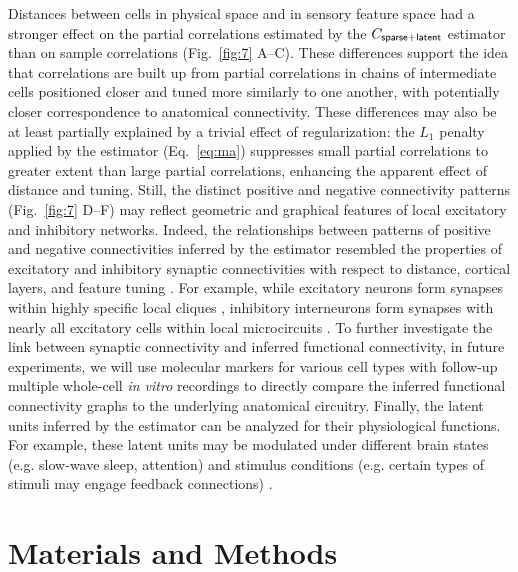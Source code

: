 Distances between cells in physical space and in sensory feature space had a stronger effect on the partial correlations estimated by the $C_{\sf sparse+latent}$ estimator than on sample correlations (Fig.~\ref{fig:7} A--C).
These differences support the idea that correlations are built up from partial correlations in chains of intermediate cells positioned closer and tuned more similarly to one another, with potentially closer correspondence to anatomical connectivity.  These differences may also be at least partially explained by a trivial effect of regularization: the $L_1$ penalty applied by the estimator (Eq.~\ref{eq:ma}) suppresses small partial correlations to greater extent than large partial correlations, enhancing the apparent effect of distance and tuning.  
Still, the distinct positive and negative connectivity patterns (Fig.\ \ref{fig:7} D--F)  may reflect geometric and graphical features of local excitatory and inhibitory networks. 
Indeed, the relationships between patterns of positive and negative connectivities inferred by the estimator resembled the properties of excitatory and inhibitory synaptic connectivities with respect to distance, cortical layers, and feature tuning \cite{Song:2005, Oswald:2008, Adesnik:2010, Perin:2011, Fino:2011, Hofer:2011, Isaacson:2011, Levy:2012}. For example, while excitatory neurons form synapses within highly specific local cliques \cite{Perin:2011}, inhibitory interneurons form synapses with nearly all excitatory cells within local microcircuits \cite{Fino:2011, Hofer:2011, Packer:2011}.  To further investigate the link between synaptic connectivity and inferred functional connectivity, in future experiments, we will use molecular markers for various cell types with follow-up multiple whole-cell \emph{in vitro} recordings \cite{Hofer:2011, Ko:2013} to directly compare the inferred functional connectivity graphs to the underlying anatomical circuitry. Finally, the latent units inferred by the estimator can be analyzed for their physiological functions. For example, these latent units may be modulated under different brain states (e.g. slow-wave sleep, attention) and stimulus conditions (e.g. certain types of stimuli may engage feedback connections) \cite{Reimer:2014,Fu:2014}.


\section*{Materials and Methods}

